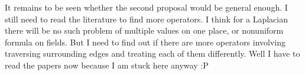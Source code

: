 \documentclass[12pt]{article}
\begin{document}
 It remains to be seen whether the second proposal would be general enough. I still need to read the literature to find more operators. I think for a Laplacian there will be no such problem of multiple values on one place, or nonuniform formula on fields. But I need to find out if there are more operators involving traversing surrounding edges and treating each of them differently. Well I have to read the papers now because I am stuck here anyway :P
\end{document}
